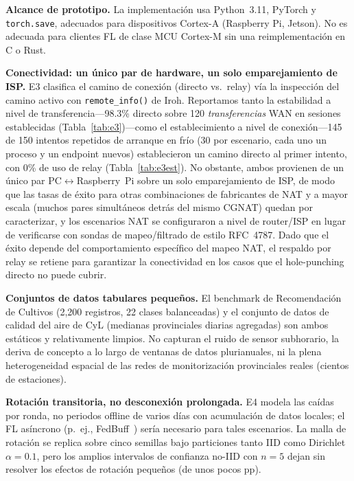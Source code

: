 \documentclass[journal]{IEEEtran}
\begin{document}
\textbf{Alcance de prototipo.} La implementación usa Python~3.11, PyTorch y \texttt{torch.save}, adecuados para dispositivos Cortex-A (Raspberry Pi, Jetson). No es adecuada para clientes FL de clase MCU Cortex-M sin una reimplementación en C o Rust.

\textbf{Conectividad: un único par de hardware, un solo emparejamiento de ISP.} E3 clasifica el camino de conexión (directo vs.~relay) vía la inspección del camino activo con \texttt{remote\_info()} de Iroh. Reportamos tanto la estabilidad a nivel de transferencia---98.3\% directo sobre 120 \emph{transferencias} WAN en sesiones establecidas (Tabla~\ref{tab:e3})---como el establecimiento a nivel de conexión---145 de 150 intentos repetidos de arranque en frío (30 por escenario, cada uno un proceso y un endpoint nuevos) establecieron un camino directo al primer intento, con 0\% de uso de relay (Tabla~\ref{tab:e3est}). No obstante, ambos provienen de un único par PC$\leftrightarrow$Raspberry~Pi sobre un solo emparejamiento de ISP, de modo que las tasas de éxito para otras combinaciones de fabricantes de NAT y a mayor escala (muchos pares simultáneos detrás del mismo CGNAT) quedan por caracterizar, y los escenarios NAT se configuraron a nivel de router/ISP en lugar de verificarse con sondas de mapeo/filtrado de estilo RFC~4787. Dado que el éxito depende del comportamiento específico del mapeo NAT, el respaldo por relay se retiene para garantizar la conectividad en los casos que el hole-punching directo no puede cubrir.

\textbf{Conjuntos de datos tabulares pequeños.} El benchmark de Recomendación de Cultivos (2,200 registros, 22 clases balanceadas) y el conjunto de datos de calidad del aire de CyL (medianas provinciales diarias agregadas) son ambos estáticos y relativamente limpios. No capturan el ruido de sensor subhorario, la deriva de concepto a lo largo de ventanas de datos plurianuales, ni la plena heterogeneidad espacial de las redes de monitorización provinciales reales (cientos de estaciones).

\textbf{Rotación transitoria, no desconexión prolongada.} E4 modela las caídas por ronda, no periodos offline de varios días con acumulación de datos locales; el FL asíncrono (p.~ej., FedBuff~\cite{fedbuff2022}) sería necesario para tales escenarios. La malla de rotación se replica sobre cinco semillas bajo particiones tanto IID como Dirichlet $\alpha{=}0.1$, pero los amplios intervalos de confianza no-IID con $n{=}5$ dejan sin resolver los efectos de rotación pequeños (de unos pocos pp).
\end{document}
